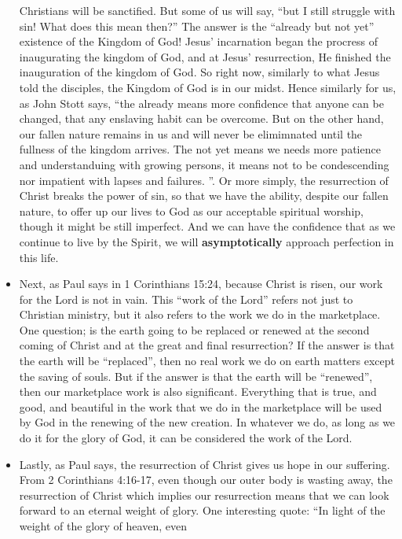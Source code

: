 \begin{itemize}
{  Christians will be sanctified.  But some of us will say, ``but I still
  struggle with sin!  What does this mean then?'' The answer is the ``already
  but not yet'' existence of the Kingdom of God!  Jesus' incarnation began
  the procress of inaugurating the kingdom of God, and at Jesus'
  resurrection, He finished the inauguration of the kingdom of God.  So right
  now, similarly to what Jesus told the disciples, the Kingdom of God is in
  our midst.  Hence similarly for us, as John Stott says, ``the already means
  more confidence that anyone can be changed, that any enslaving habit can be
  overcome.  But on the other hand, our fallen nature remains in us and will
  never be elimimnated until the fullness of the kingdom arrives.  The not
  yet means we needs more patience and understanduing with growing persons,
  it means not to be condescending nor impatient with lapses and failures.
  ''.  Or more simply, the resurrection of Christ breaks the power of sin, so
  that we have the ability, despite our fallen nature, to offer up our lives
  to God as our acceptable spiritual worship, though it might be still
  imperfect.  And we can have the confidence that as we continue to live by
  the Spirit, we will \textbf{asymptotically} approach perfection in this
  life.  }
  \item{Next, as Paul says in 1 Corinthians 15:24, because Christ is risen,
  our work for the Lord is not in vain.  This ``work of the Lord'' refers not
  just to Christian ministry, but it also refers to the work we do in the
  marketplace.  One question; is the earth going to be replaced or renewed at
  the second coming of Christ and at the great and final resurrection?  If
  the answer is that the earth will be ``replaced'', then no real work we do
  on earth matters except the saving of souls.  But if the answer is that the
  earth will be ``renewed'', then our marketplace work is also significant.
  Everything that is true, and good, and beautiful in the work that we do in
  the marketplace will be used by God in the renewing of the new creation.
  In whatever we do, as long as we do it for the glory of God, it can be
  considered the work of the Lord.}
  \item{Lastly, as Paul says, the resurrection of Christ gives us hope in our
  suffering.  From 2 Corinthians 4:16-17, even though our outer body is
  wasting away, the resurrection of Christ which implies our resurrection
  means that we can look forward to an eternal weight of glory.  One
  interesting quote: ``In light of the weight of the glory of heaven, even
}
\end{itemize}
